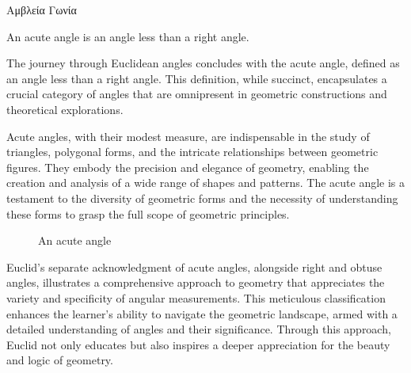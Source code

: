 
\begin{defin}
\textgreek{Αμβλεία Γωνία}

An acute angle is an angle less than a right angle.
\end{defin}

The journey through Euclidean angles concludes with the acute angle, defined as an angle less than a right angle. This definition, while succinct, encapsulates a crucial category of angles that are omnipresent in geometric constructions and theoretical explorations.

Acute angles, with their modest measure, are indispensable in the study of triangles, polygonal forms, and the intricate relationships between geometric figures. They embody the precision and elegance of geometry, enabling the creation and analysis of a wide range of shapes and patterns. The acute angle is a testament to the diversity of geometric forms and the necessity of understanding these forms to grasp the full scope of geometric principles.

\begin{figure}[H]
	\centering
	\caption{An acute angle}
\end{figure}

Euclid's separate acknowledgment of acute angles, alongside right and obtuse angles, illustrates a comprehensive approach to geometry that appreciates the variety and specificity of angular measurements. This meticulous classification enhances the learner's ability to navigate the geometric landscape, armed with a detailed understanding of angles and their significance. Through this approach, Euclid not only educates but also inspires a deeper appreciation for the beauty and logic of geometry.